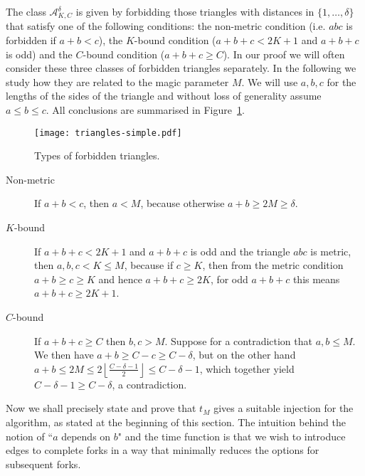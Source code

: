 \documentclass[11pt]{amsart}
\begin{document}
The class $\mathcal A^\delta_{K,C}$ is given by forbidding those triangles with distances in $\{1, \ldots, \delta\}$ that satisfy one of the following conditions:
the non-metric condition (i.e. $abc$ is forbidden if $a+b<c$),
the $K$-bound condition ($a+b+c < 2K+1$ and $a+b+c$ is odd) and
the $C$-bound condition ($a+b+c \geq C$).
In our proof we will often consider these three classes of forbidden triangles separately. In the following we study how they are related to the magic parameter $M$. We will use $a,b,c$ for the lengths of the sides of the triangle and without loss of generality assume $a\leq b\leq c$. All conclusions are summarised in Figure~\ref{fig:Ftriangles}.
\begin{figure}
\centering
\texttt{[image: triangles-simple.pdf]}
\caption{Types of forbidden triangles.}
\label{fig:Ftriangles}
\end{figure}%
\begin{description}
\item[Non-metric] If $a+b<c$, then $a < M$, because otherwise $a+b\geq 2M \geq \delta$.

\item [$K$-bound] If $a+b+c < 2K+1$ and $a+b+c$ is odd and the triangle $abc$ is metric, then $a,b,c < K\leq M$, because if $c\geq K$, then from the metric condition $a+b\geq c\geq K$ and hence $a+b+c\geq 2K$, for odd $a+b+c$ this means $a+b+c\geq 2K+1$.

\item [$C$-bound]If $a+b+c\geq C$ then $b,c > M$. Suppose for a contradiction that $a,b\leq M$. We then have $a+b\geq C-c\geq C-\delta$, but on the other hand $a+b\leq 2M\leq 2\left\lfloor \frac{C-\delta-1}{2} \right\rfloor\leq C-\delta-1$, which together yield $C-\delta-1\geq C-\delta$, a contradiction.
\end{description}

Now we shall precisely state and prove that $t_M$ gives a suitable injection for the algorithm, as stated at the beginning of this section. The intuition behind the notion of ``$a$ depends on $b$" and the time function is that we wish to introduce edges to complete forks in a way that minimally reduces the options for subsequent forks.
\end{document}
